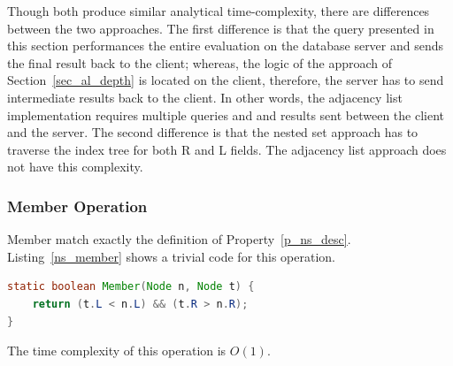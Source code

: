 Though both produce similar analytical time-complexity, there are differences between the two approaches. The first difference is that the query presented in this section performances the entire evaluation on the database server and sends the final result back to the client; whereas, the logic of the approach of Section~\ref{sec_al_depth} is located on the client, therefore, the server has to send intermediate results back to the client. In other words, the adjacency list implementation requires multiple queries and and results sent between the client and the server. The second difference is that the nested set approach has to traverse the index tree for both R and L fields. The adjacency list approach does not have this complexity.





\subsubsection{Member Operation}

Member match exactly the definition of Property~\ref{p_ns_desc}. Listing~\ref{ns_member} shows a trivial code for this operation.

\begin{lstlisting}[language=java,caption={Member Operation},label=ns_member, float]
static boolean Member(Node n, Node t) {
    return (t.L < n.L) && (t.R > n.R);
}
\end{lstlisting}

The time complexity of this operation is $O(1)$.

